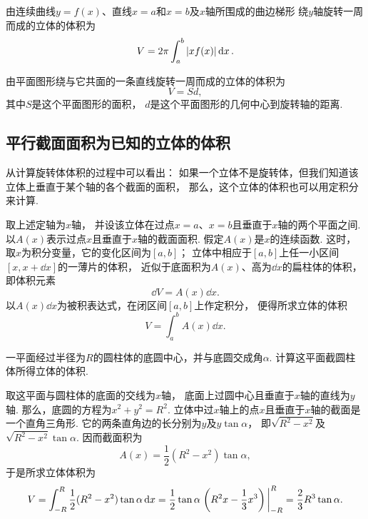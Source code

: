由连续曲线\(y=f(x)\)、直线\(x=a\)和\(x=b\)及\(x\)轴所围成的曲边梯形
绕\(y\)轴旋转一周而成的立体的体积为
\begin{equation}\label{equation:定积分.曲边梯形绕y轴旋转体的体积}
	V = 2\pi \int_a^b \abs{x f(x)} \dd{x}.
\end{equation}

\begin{theorem}[古尔丁体积定理]
由平面图形绕与它共面的一条直线旋转一周而成的立体的体积为\begin{equation}
	V = S d,
\end{equation}
其中\(S\)是这个平面图形的面积，
\(d\)是这个平面图形的几何中心到旋转轴的距离.
\end{theorem}

\subsection{平行截面面积为已知的立体的体积}
从计算旋转体体积的过程中可以看出：
如果一个立体不是旋转体，但我们知道该立体上垂直于某个轴的各个截面的面积，
那么，这个立体的体积也可以用定积分来计算.

取上述定轴为\(x\)轴，
并设该立体在过点\(x=a\)、\(x=b\)且垂直于\(x\)轴的两个平面之间.
以\(A(x)\)表示过点\(x\)且垂直于\(x\)轴的截面面积.
假定\(A(x)\)是\(x\)的连续函数.
这时，取\(x\)为积分变量，它的变化区间为\([a,b]\)；
立体中相应于\([a,b]\)上任一小区间\([x,x+\dd{x}]\)的一薄片的体积，
近似于底面积为\(A(x)\)、高为\(\dd{x}\)的扁柱体的体积，
即体积元素\[
	\dd{V} = A(x) \dd{x}.
\]
以\(A(x) \dd{x}\)为被积表达式，在闭区间\([a,b]\)上作定积分，
便得所求立体的体积\[
	V = \int_a^b A(x) \dd{x}.
\]

\begin{example}
一平面经过半径为\(R\)的圆柱体的底圆中心，并与底圆交成角\(\alpha\).
计算这平面截圆柱体所得立体的体积.
\begin{solution}
取这平面与圆柱体的底面的交线为\(x\)轴，
底面上过圆中心且垂直于\(x\)轴的直线为\(y\)轴.
那么，底圆的方程为\(x^2+y^2=R^2\).
立体中过\(x\)轴上的点\(x\)且垂直于\(x\)轴的截面是一个直角三角形.
它的两条直角边的长分别为\(y\)及\(y \tan\alpha\)，
即\(\sqrt{R^2-x^2}\)及\(\sqrt{R^2-x^2} \tan\alpha\).
因而截面积为\[
	A(x) = \frac12 (R^2-x^2) \tan\alpha,
\]
于是所求立体体积为\[
	V = \int_{-R}^R \frac12 (R^2-x^2) \tan\alpha \dd{x}
	= \frac12 \tan\alpha \eval{\left(R^2x-\frac13x^3\right)}_{-R}^R
	= \frac23 R^3 \tan\alpha.
\]
\end{solution}
\end{example}

